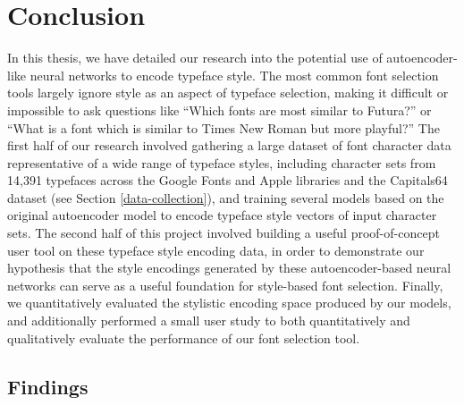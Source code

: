 \chapter{Conclusion}
\label{chap:conclusion}

In this thesis, we have detailed our research into the potential use of autoencoder-like neural networks to encode typeface style. The most common font selection tools largely ignore style as an aspect of typeface selection, making it difficult or impossible to ask questions like ``Which fonts are most similar to Futura?'' or ``What is a font which is similar to Times New Roman but more playful?'' The first half of our research involved gathering a large dataset of font character data representative of a wide range of typeface styles, including character sets from 14,391 typefaces across the Google Fonts and Apple libraries and the Capitals64 dataset (see Section \ref{data-collection}), and training several models based on the original autoencoder model to encode typeface style vectors of input character sets. The second half of this project involved building a useful proof-of-concept user tool on these typeface style encoding data, in order to demonstrate our hypothesis that the style encodings generated by these autoencoder-based neural networks can serve as a useful foundation for style-based font selection. Finally, we quantitatively evaluated the stylistic encoding space produced by our models, and additionally performed a small user study to both quantitatively and qualitatively evaluate the performance of our font selection tool.

\section{Findings}

